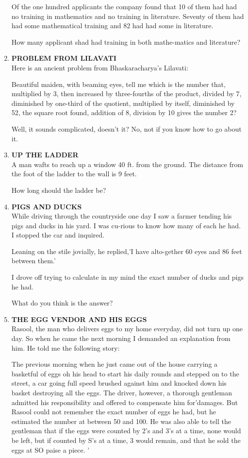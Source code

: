 \documentclass[12pt]{article}
\begin{document}
\begin{enumerate}
Of the one hundred  applicants  the company  found  that 10 of them  had  had  no training  in mathematics  and no training  in literature.  Seventy  of them  had  had  some mathematical  training  and 82 had had some  in literature. 

How  many  applicant  shad  had training  in both  mathe-matics  and literature? 
%
\item \textbf{PROBLEM  FROM  LILAVATI} \\ 
Here  is an ancient  problem  from  Bhaskaracharya's Lilavati: 

Beautiful  maiden,  with  beaming  eyes,  tell me which  is the number  that,  multiplied  by 3, then  increased  by three-fourths  of the product,  divided  by 7, diminished  by one-third  of the  quotient,  multiplied  by itself,  diminished  by 52, the  square  root  found,  addition  of 8, division  by 10 gives  the number  2? 

Well,  it sounds  complicated,  doesn't  it? No,  not if you know  how  to go about  it. 
%
\item \textbf{UP THE  LADDER} \\ 
A man  wafts  to reach  up a window  40 ft. from  the ground. The distance  from  the foot  of the ladder  to the wall  is 9 feet. 

How  long  should  the ladder  be? 
%
\item \textbf{PIGS  AND  DUCKS} \\
While  driving  through  the  countryside  one  day I saw a farmer  tending  his pigs  and ducks  in his yard.  I was  cu-rious  to know  how  many  of each  he had.  I stopped  the car and inquired. 

Leaning  on the  stile  jovially,  he replied,'I  have  alto-gether  60 eyes  and 86 feet between  them.'

I drove  off trying  to calculate  in my mind  the  exact number  of ducks  and pigs  he had. 

What  do you think  is the answer? 
%
\item \textbf{THE  EGG  VENDOR  AND  HIS  EGGS} \\
Rasool,  the man  who  delivers  eggs  to my home  everyday, did not  turn  up one  day.  So  when  he came  the next morning  I demanded  an explanation  from  him.  He  told me the following  story: 

The previous  morning  when  he just  came  out  of the house  carrying  a basketful  of eggs  oh his head  to start  his daily  rounds  and  stepped  on to the  street,  a car going full speed  brushed  against  him  and  knocked  down  his basket  destroying  all the  eggs.  The  driver,  however,  a thorough  gentleman  admitted  his responsibility  and offered to compensate  him  for'damages.  But  Rasool  could not remember  the exact  number  of eggs  he had,  but  he estimated  the  number  at between  50 and 100.  He  was also able  to tell the gentleman  that  if the eggs  were  counted by 2's and 3's at a time,  none  would  be left,  but if counted by S's at a time,  3 would  remain,  and that  he sold  the eggs at SO paise  a piece.  ' 


\end{enumerate}
\end{document}
